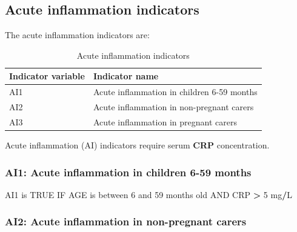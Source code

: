 \documentclass[12pt,a4paper]{article}
\newenvironment{Shaded}{\begin{snugshade}}{\end{snugshade}}
\newcommand{\DecValTok}[1]{\textcolor[rgb]{0.00,0.00,0.81}{#1}}
\newcommand{\NormalTok}[1]{#1}
\newcommand{\OperatorTok}[1]{\textcolor[rgb]{0.81,0.36,0.00}{\textbf{#1}}}
\newcommand{\OtherTok}[1]{\textcolor[rgb]{0.56,0.35,0.01}{#1}}
\newcommand{\StringTok}[1]{\textcolor[rgb]{0.31,0.60,0.02}{#1}}
\begin{document}
\hypertarget{acute-inflammation-indicators}{%
\subsection{Acute inflammation indicators}\label{acute-inflammation-indicators}}

The acute inflammation indicators are:

\begin{table}[H]

\caption{\label{tab:acute-inflammation}Acute inflammation indicators}
\centering
\begin{tabular}[t]{ll}
\toprule
\textbf{Indicator variable} & \textbf{Indicator name}\\
\midrule
\rowcolor{gray!6}  AI1 & Acute inflammation in children 6-59 months\\
AI2 & Acute inflammation in non-pregnant carers\\
\rowcolor{gray!6}  AI3 & Acute inflammation in pregnant carers\\
\bottomrule
\end{tabular}
\end{table}

Acute inflammation (AI) indicators require serum \textbf{CRP} concentration.

\hypertarget{ai1-acute-inflammation-in-children-6-59-months}{%
\subsubsection{AI1: Acute inflammation in children 6-59 months}\label{ai1-acute-inflammation-in-children-6-59-months}}

\begin{Shaded}
\begin{Highlighting}[]
\NormalTok{AI1 is }\OtherTok{TRUE}\NormalTok{ IF AGE is between }\DecValTok{6}\NormalTok{ and }\DecValTok{59}\NormalTok{ months old AND CRP }\OperatorTok{>}\StringTok{ }\DecValTok{5}\NormalTok{ mg}\OperatorTok{/}\NormalTok{L}
\end{Highlighting}
\end{Shaded}

\hypertarget{ai2-acute-inflammation-in-non-pregnant-carers}{%
\subsubsection{AI2: Acute inflammation in non-pregnant carers}\label{ai2-acute-inflammation-in-non-pregnant-carers}}
\end{document}
